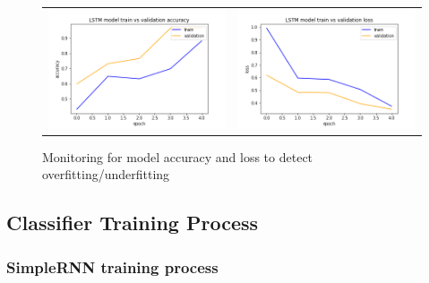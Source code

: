 \begin{figure}
   \centering
\begin{tabular}{cc}
\includegraphics[width=7.5cm]{images/classifier/model-train-vs-validation-accuracy}&
\includegraphics[width=7.5cm]{images/classifier/model-train-vs-validation-loss}\\
\end{tabular}
    \caption{Monitoring for model accuracy and loss to detect overfitting/underfitting}
    \label{model-validation-monitoring}
\end{figure}

\subsection{Classifier Training Process}
\label{classifier-training-process}

\subsubsection{SimpleRNN training process} 

